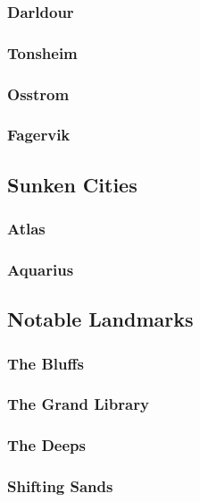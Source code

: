 		\subsubsection{Darldour}

		\subsubsection{Tonsheim}

		\subsubsection{Osstrom}

		\subsubsection{Fagervik}

	\subsection{Sunken Cities}

		\subsubsection{Atlas}

		\subsubsection{Aquarius}
	
	\subsection{Notable Landmarks}

		\subsubsection{The Bluffs}
		
		\subsubsection{The Grand Library}

		\subsubsection{The Deeps}

		\subsubsection{Shifting Sands}
		
